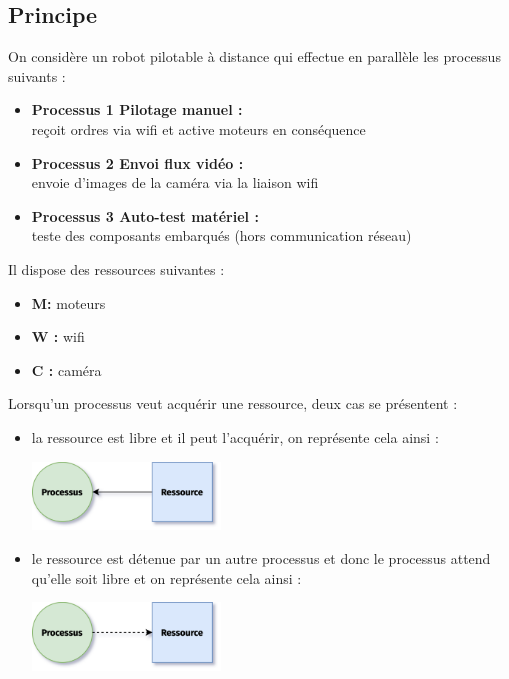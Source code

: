 \documentclass[12pt,a4paper,article,english,firamath]{nsi}
\begin{document}
\maketitle




\subsection*{Principe}
On considère un robot pilotable à distance qui effectue en parallèle les processus suivants :
\begin{itemize}
	\item 	\textbf{Processus 1  Pilotage manuel : }\\ reçoit ordres via wifi et active moteurs en conséquence
	\item 	\textbf{Processus 2  Envoi flux vidéo : }\\ envoie d'images de la caméra via la liaison wifi
    \item 	\textbf{Processus 3  Auto-test matériel : }\\ teste des composants embarqués (hors communication réseau)
\end{itemize}
	

Il dispose des ressources suivantes :
\begin{itemize}
	\item 	\textbf{M: }  moteurs
	\item 	\textbf{W : }  wifi
    \item 	\textbf{C : }	caméra
\end{itemize}

Lorsqu'un processus veut acquérir une ressource, deux cas se présentent :
\begin{itemize}
	\item 	la ressource est libre et il peut l'acquérir, on représente cela ainsi :
			\begin{center}
			\includegraphics[width=5cm]{img/d1.png}
			\end{center}
	\item 	le ressource est détenue par un autre processus et donc le processus attend qu'elle soit libre et on représente cela ainsi :
	\begin{center}
			\includegraphics[width=5cm]{img/d2.png}
			\end{center}
\end{itemize}
\end{document}
